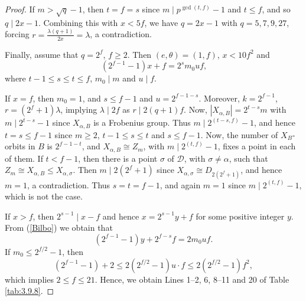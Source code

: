 \documentclass[a4paper,twopage,reqno,12pt]{amsart}
\theoremstyle{definition}
\numberwithin{equation}{section}
\renewcommand{\leq}{\leqslant}
\renewcommand{\geq}{\geqslant}
\begin{document}
\begin{proof}
If $m > \sqrt{q}-1$, then $t=f=s$ since $m \mid p^{\gcd(t,f)}-1$ and $t \leq f$, and so $q\mid 2x-1$.
Combining this with $x<5f$, we have $q=2x-1$ with $q=5,7,9,27$,
forcing $r=\frac{\lambda(q+1)}{2x}=\lambda$, a contradiction.

Finally, assume that $q=2^{f}$, $f\geq 2$. 
Then $(e,\theta)=(1,f)$, $x< 10f^2$ and
\begin{equation}\label{Bilbo}
\left( 2^{f-1}-1\right) x+f =2^{s}m _{0}uf\text{,}
\end{equation}
where $t-1\leq s\leq t\leq f$, $m_{0} \mid m$ and $u \mid f$.

If $x=f$, then $m_{0}=1$, and $s\leq f-1$ and $u=2^{f-1-s}$. Moreover, $k = 2^{f-1}$, $r = (2^f + 1)\lambda$, implying $\lambda \mid 2f$ as $r\mid 2(q+1)f$. Now, $\left\vert X_{\alpha,B} \right\vert=2^{t-s}m$ with $m \mid 2^{t-s}-1$ since $X_{\alpha,B}$ is a Frobenius group. Thus $m\mid 2^{(t-s,f)}-1$, and hence $t=s\leq f-1$ since $m \geq 2$, $t-1\leq s \leq t$ and $s\leq f-1$. Now, the number of $X_{B}$-orbits in $B$ is $2^{f-1-t}$, and $X_{\alpha,B}\cong Z_{m}$, with $m\mid 2^{(t,f)}-1$, fixes a point in each of them. If $t<f-1$, then there is a point $\sigma$ of $\mathcal{D}$, with $\sigma \neq \alpha$, such that $Z_{m} \cong X_{\alpha,B}\leq X_{\alpha, \sigma}$. Then $m\mid 2(2^{f}+1)$ since $ X_{\alpha, \sigma} \cong D_{2(2^{f}+1)}$, and hence $m=1$, a contradiction. Thus $s=t=f-1$, and again $m=1$ since $m\mid 2^{(t,f)}-1$, which is not the case. 

If $x> f$, then $2^{s-1}\mid x-f$ and hence $x=2^{s-1}y+f$ for some positive integer $y$.
From (\ref{Bilbo}) we obtain that 
\[
(2^{f-1}-1)y+2^{f-s}f =2m_{0}uf.
\]
If $m_{0} \leq 2^{f/2}-1$, then 
\[
(2^{f-1}-1)+2\leq 2\left( 2^{f/2}-1\right) u\cdot f\leq 2\left( 2^{f/2}-1\right)f^{2},
\]
which implies $2\leq f \leq 21$. 
Hence, we obtain Lines 1--2, 6, 8--11 and 20 of Table \ref{tab:3.9.8}.




\end{proof}
\end{document}
